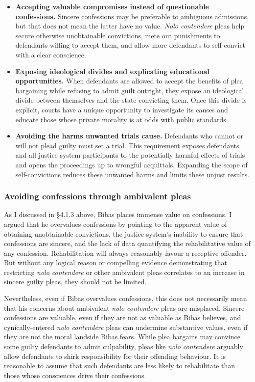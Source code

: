 \begin{itemize}
    \item \textbf{Accepting valuable compromises instead of questionable confessions.} Sincere confessions may be preferable to ambiguous admissions, but that does not mean the latter have no value. \textit{Nolo contendere} pleas help secure otherwise unobtainable convictions, mete out punishments to defendants willing to accept them, and allow more defendants to self-convict with a clear conscience.
    \item \textbf{Exposing ideological divides and explicating educational opportunities.} When defendants are allowed to accept the benefits of plea bargaining while refusing to admit guilt outright, they expose an ideological divide between themselves and the state convicting them. Once this divide is explicit, courts have a unique opportunity to investigate its causes and educate those whose private morality is at odds with public standards.
    \item \textbf{Avoiding the harms unwanted trials cause.} Defendants who cannot or will not plead guilty must set a trial. This requirement exposes defendants and all justice system participants to the potentially harmful effects of trials and opens the proceedings up to wrongful acquittals. Expanding the scope of self-convictions reduces these unwanted harms and limits these unjust results.
\end{itemize}

\subsubsection{Avoiding confessions through ambivalent pleas}

As I discussed in \S 4.1.3 above, Bibas places immense value on confessions. I argued that he overvalues confessions by pointing to the apparent value of obtaining unobtainable convictions, the justice system's inability to ensure that confessions are sincere, and the lack of data quantifying the rehabilitative value of any confession. Rehabilitation will always reasonably favour a receptive offender. But without any logical reason or compelling evidence demonstrating that restricting \textit{nolo contendere} or other ambivalent pleas correlates to an increase in sincere guilty pleas, they should not be limited.

Nevertheless, even if Bibas overvalues confessions, this does not necessarily mean that his concerns about ambivalent \textit{nolo contendere} pleas are misplaced. Sincere confessions are valuable, even if they are not as valuable as Bibas believes, and cynically-entered \textit{nolo contendere} pleas can undermine substantive values, even if they are not the moral landside Bibas fears. While plea bargains may convince some guilty defendants to admit culpability, pleas like \textit{nolo contendere} arguably allow defendants to shirk responsibility for their offending behaviour. It is reasonable to assume that such defendants are less likely to rehabilitate than those whose consciences drive their confessions.


